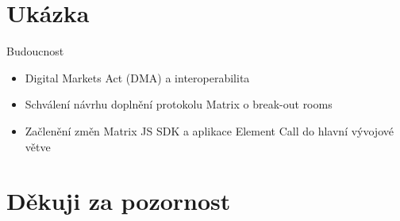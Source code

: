 \documentclass[aspectratio=169]{beamer}
\begin{document}
\section{Ukázka}
\begin{frame}{Budoucnost}
    \pause
    \begin{itemize}[<+->]
        \item Digital Markets Act (DMA) a interoperabilita
        \item Schválení návrhu doplnění protokolu Matrix o break-out rooms
        \item Začlenění změn Matrix JS SDK a aplikace Element Call do hlavní vývojové větve
    \end{itemize}
\end{frame}
\section{Děkuji za pozornost}
\end{document}
